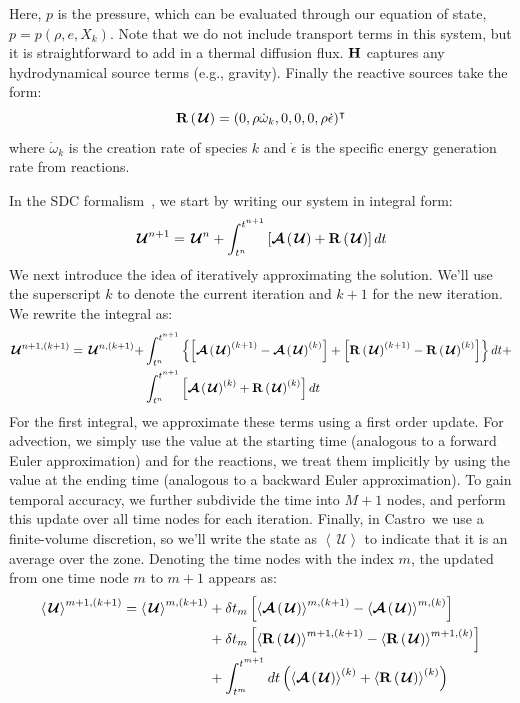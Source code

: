 \documentclass[a4paper]{jpconf}
\newcommand{\castro}{{\sffamily Castro}}
\newcommand{\Uc}{{\,\bm{\mathcal{U}}}}
\newcommand{\Advs}[1]{\boldsymbol{\mathcal{A}} \left(#1\right)}
\newcommand{\omegadot}{\dot{\omega}}
\newcommand{\avg}[1]{{\left \langle #1 \right \rangle}}
\newcommand{\Rbs}[1]{{\bf R} \left ( #1 \right )}
\begin{document}
Here, $p$ is the pressure, which can be evaluated through our equation
of state, $p = p(\rho, e, X_k)$.  Note that we do not include
transport terms in this system, but it is straightforward to add in a
thermal diffusion flux.  ${\bf H}$ captures any hydrodynamical source
terms (e.g., gravity).  Finally the reactive sources take the form:
\begin{equation}
\Rbs{\Uc} = (0, \rho \omegadot_k, 0, 0, 0, \rho \dot{\epsilon})^\intercal
\end{equation}
where $\omegadot_k$ is the creation rate of species $k$ and $\dot{\epsilon}$
is the specific energy generation rate from reactions.

In the SDC formalism~\cite{dutt:2000,minion:2003}, we start by writing our system in integral form:
\begin{equation}
\Uc^{n+1} = \Uc^n + \int_{t^n}^{t^{n+1}} \left [\Advs{\Uc} + \Rbs{\Uc} \right ] dt
\end{equation}
We next introduce the idea of iteratively approximating the solution.
We'll use the superscript $k$ to denote the current iteration and
$k+1$ for the new iteration.  We rewrite the integral as:
\begin{align}
\Uc^{n+1,(k+1)} = \Uc^{n,(k+1)} +
   &\int_{t^n}^{t^{n+1}} \left \{ \left [ \Advs{\Uc}^{(k+1)} - \Advs{\Uc}^{(k)} \right ]
   + \left [ \Rbs{\Uc}^{(k+1)} - \Rbs{\Uc}^{(k)} \right ] \right \} dt + \nonumber \\
  & \int_{t^n}^{t^{n+1}} \left [\Advs{\Uc}^{(k)} + \Rbs{\Uc}^{(k)} \right ] dt
\end{align}
For the first integral, we approximate these terms using a first order
update.  For advection, we simply use the value at the starting time
(analogous to a forward Euler approximation) and for the reactions, we
treat them implicitly by using the value at the ending time (analogous
to a backward Euler approximation).  To gain temporal accuracy, we
further subdivide the time into $M+1$ nodes, and perform this update
over all time nodes for each iteration.  Finally, in \castro\ we use a finite-volume
discretion, so we'll write the state as $\avg{\Uc}$ to indicate that it is an average over the zone.
Denoting the time nodes with
the index $m$, the updated from one time node $m$ to $m+1$ appears as:
    \begin{align}
      \label{eq:sdc:general}
      \avg{\Uc}^{{m+1},(k+1)} = \avg{\Uc}^{m,(k+1)}
            &+ \delta t_m \left [ \avg{\Advs{\Uc}}^{m,(k+1)} - \avg{\Advs{\Uc}}^{m,(k)} \right ] \nonumber \\
            &+ \delta t_m \left [ \avg{\Rbs{\Uc}}^{{m+1},(k+1)} - \avg{\Rbs{\Uc}}^{{m+1},(k)} \right ] \nonumber \\
            &+ \int_{t^m}^{t^{m+1}} dt  \left (\avg{\Advs{\Uc}}^{(k)} + \avg{\Rbs{\Uc}}^{(k)}\right)
   \end{align}
\end{document}
